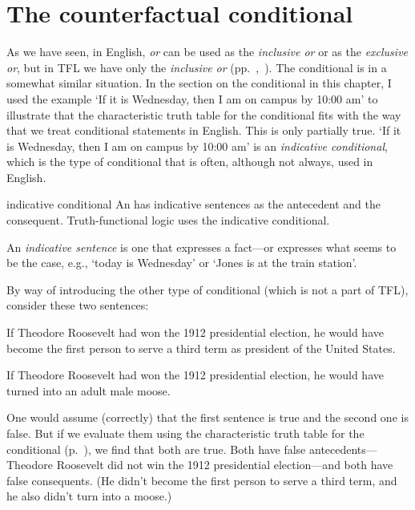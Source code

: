 \section{The counterfactual conditional}

As we have seen, in English, \textit{or} can be used as the \textit{inclusive or} or as the \textit{exclusive or}, but in TFL we have only the \textit{inclusive or} (pp.~\pageref{inclusive-or-1},~\pageref{tt-disjunction}). The conditional is in a somewhat similar situation. In the section on the conditional in this chapter, I used the example `If it is Wednesday, then I am on campus by 10:00 am’ to illustrate that the characteristic truth table for the conditional fits with the way that we treat conditional statements in English. This is only partially true. `If it is Wednesday, then I am on campus by 10:00 am’ is an \textit{indicative conditional}, which is the type of conditional that is often, although not always, used in English.

\begin{factboxy}{indicative conditional}
An  has indicative sentences as the antecedent and the consequent. Truth-functional logic uses the indicative conditional. 

An \textit{indicative sentence} is one that expresses a fact---or expresses what seems to be the case, e.g., `today is Wednesday' or `Jones is at the train station’.
\end{factboxy} 

By way of introducing the other type of conditional (which is not a part of TFL), consider these two sentences:

\begin{ebullet}
\item[1.] If Theodore Roosevelt had won the 1912 presidential election, he would have become the first person to serve a third term as president of the United States. \smallskip
\item[2.] If Theodore Roosevelt had won the 1912 presidential election, he would have turned into an adult male moose.
\end{ebullet}
One would assume (correctly) that the first sentence is true and the second one is false. But if we evaluate them using the characteristic truth table for the conditional (p.~\pageref{characteristic-tt-conditional}), we find that both are true. Both have false antecedents---Theodore Roosevelt did not win the 1912 presidential election---and both have false consequents. (He didn’t become the first person to serve a third term, and he also didn’t turn into a moose.)

